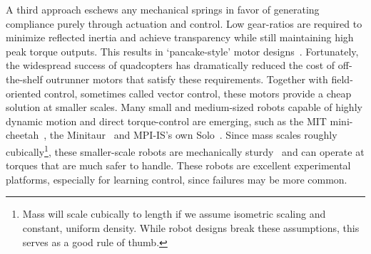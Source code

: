 \par
A third approach eschews any mechanical springs in favor of generating compliance purely through actuation and control. Low gear-ratios are required to minimize reflected inertia and achieve transparency while still maintaining high peak torque outputs. This results in `pancake-style' motor designs~\cite{Seok2012proprioceptive}.
Fortunately, the widespread success of quadcopters has dramatically reduced the cost of off-the-shelf outrunner motors that satisfy these requirements. Together with field-oriented control, sometimes called vector control, these motors provide a cheap solution at smaller scales. Many small and medium-sized robots capable of highly dynamic motion and direct torque-control are emerging, such as the MIT mini-cheetah~\cite{katz2019mini}, the Minitaur~\cite{kenneally2016design} and MPI-IS's own Solo~\cite{grimminger2019open}. Since mass scales roughly cubically\footnote{Mass will scale cubically to length if we assume isometric scaling and constant, uniform density. While robot designs break these assumptions, this serves as a good rule of thumb.}, these smaller-scale robots are mechanically sturdy~\cite{biewener2005biomechanical} and can operate at torques that are much safer to handle. These robots are excellent experimental platforms, especially for learning control, since failures may be more common. \par





